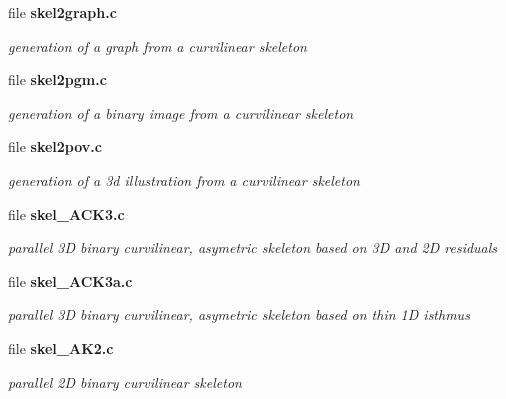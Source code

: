 \begin{DoxyCompactItemize}
\item 
file {\bf skel2graph.c}


\begin{DoxyCompactList}\small\item\em generation of a graph from a curvilinear skeleton \item\end{DoxyCompactList}

\item 
file {\bf skel2pgm.c}


\begin{DoxyCompactList}\small\item\em generation of a binary image from a curvilinear skeleton \item\end{DoxyCompactList}

\item 
file {\bf skel2pov.c}


\begin{DoxyCompactList}\small\item\em generation of a 3d illustration from a curvilinear skeleton \item\end{DoxyCompactList}

\item 
file {\bf skel\_\-ACK3.c}


\begin{DoxyCompactList}\small\item\em parallel 3D binary curvilinear, asymetric skeleton based on 3D and 2D residuals \item\end{DoxyCompactList}

\item 
file {\bf skel\_\-ACK3a.c}


\begin{DoxyCompactList}\small\item\em parallel 3D binary curvilinear, asymetric skeleton based on thin 1D isthmus \item\end{DoxyCompactList}

\item 
file {\bf skel\_\-AK2.c}


\begin{DoxyCompactList}\small\item\em parallel 2D binary curvilinear skeleton \item\end{DoxyCompactList}


\end{DoxyCompactItemize}
